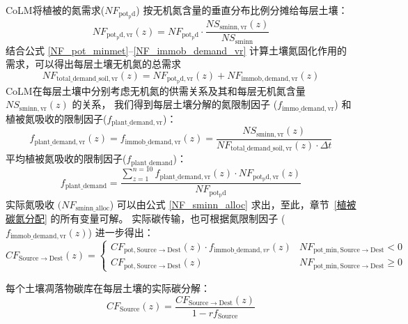 CoLM将植被的氮需求($NF_{\mathrm{pot_pd}}$) 按无机氮含量的垂直分布比例分摊给每层土壤：
\begin{equation}
  NF_{\mathrm{pot_pd,vr}}(z)=NF_{\mathrm{pot_pd}}\cdot\frac{NS_{\mathrm{sminn,vr}}(z)}{NS_{\mathrm{sminn}}}
\end{equation}
结合公式 \eqref{NF_pot_minmet}--\eqref{NF_immob_demand_vr} 计算土壤氮固化作用的需求，可以得出每层土壤无机氮的总需求
\begin{equation}
  NF_{\mathrm{total\_{demand\_{soil}},vr}}(z)=NF_{\mathrm{pot_pd,vr}}(z)+NF_{\mathrm{immob,demand,vr}}\left(z\right)
\end{equation}
CoLM在每层土壤中分别考虑无机氮的供需关系及其和每层无机氮含量 ${NS}_{\mathrm{sminn,vr}}(z)$ 的关系，
我们得到每层土壤分解的氮限制因子 ($f_{\mathrm{immo\_{demand},vr}}$) 和植被氮吸收的限制因子($f_{\mathrm{plant\_{demand},vr}}$)：
\begin{equation}
  f_{\mathrm{plant\_{demand},vr}}(z)=f_{\mathrm{immob\_{demand},vr}}(z)=\frac{NS_{\mathrm{sminn,vr}}(z)}{NF_{\mathrm{total\_{demand\_{soil}},vr}}(z)\cdot\Delta t}
\end{equation}
平均植被氮吸收的限制因子($f_{\mathrm{plant\_{demand}}}$)：
\begin{equation}
  f_{\mathrm{plant\_{demand}}}=\frac{\sum_{z=1}^{n=10}{f_{\mathrm{plant\_{demand},vr}}(z)\cdot NF_{\mathrm{pot_pd,vr}}(z)}}{NF_{\mathrm{pot_pd}}}
\end{equation}
实际氮吸收 $(NF_{\mathrm{sminn\_{alloc}}}$) 可以由公式 \eqref{NF_sminn_alloc} 求出，至此，章节~\ref{植被碳氮分配} 的所有变量可解。
实际碳传输，也可根据氮限制因子 ($f_{\mathrm{immob\_{demand},vr}}(z)$) 进一步得出：
\begin{equation}
  CF_{\mathrm{Source \rightarrow { Dest }}}(z)=\left\{\begin{array}{ll}C F_{\mathrm{pot, Source \rightarrow Dest}}(z) \cdot f_{\mathrm{{immob}}\_{\mathrm{demand}, vr}}(z) & NF_{\mathrm{pot\_{min}, Source \rightarrow {Dest}}} <0 \\
      CF_{\mathrm{pot, Source \rightarrow { Dest }}}(z) & NF_{\mathrm{pot\_{min}, Source \rightarrow {Dest}}} \geqslant 0
  \end{array}\right.
\end{equation}

每个土壤凋落物碳库在每层土壤的实际碳分解：
\begin{equation}
  CF_{\mathrm{Source}}(z)=\frac{CF_{\mathrm{Source \rightarrow { Dest }}}(z)}{1-r f_{\mathrm{Source}}}
\end{equation}

